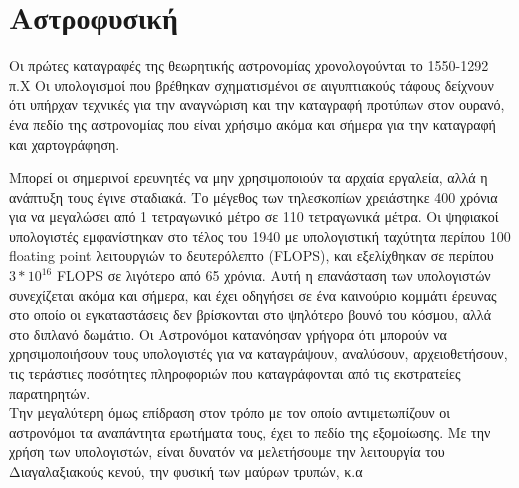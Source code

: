 \section{Αστροφυσική}
Οι πρώτες καταγραφές της θεωρητικής αστρονομίας χρονολογούνται το 1550-1292 π.Χ Οι υπολογισμοί που βρέθηκαν σχηματισμένοι σε αιγυπτιακούς τάφους δείχνουν ότι υπήρχαν τεχνικές για την αναγνώριση και την καταγραφή προτύπων στον ουρανό, ένα πεδίο της αστρονομίας που είναι χρήσιμο ακόμα και σήμερα για την καταγραφή και χαρτογράφηση.

Μπορεί οι σημερινοί ερευνητές να μην χρησιμοποιούν τα αρχαία εργαλεία, αλλά η ανάπτυξη τους έγινε σταδιακά. Το μέγεθος των τηλεσκοπίων χρειάστηκε 400 χρόνια για να μεγαλώσει από 1 τετραγωνικό μέτρο σε 110 τετραγωνικά μέτρα. Οι ψηφιακοί υπολογιστές εμφανίστηκαν στο τέλος του 1940 με υπολογιστική ταχύτητα περίπου 100 floating point λειτουργιών το δευτερόλεπτο (FLOPS), και εξελίχθηκαν σε περίπου $3*10^{16}$ FLOPS σε λιγότερο από 65 χρόνια. Αυτή η επανάσταση των υπολογιστών συνεχίζεται ακόμα και σήμερα, και έχει οδηγήσει σε ένα καινούριο κομμάτι έρευνας στο οποίο οι εγκαταστάσεις δεν βρίσκονται στο ψηλότερο βουνό του κόσμου, αλλά στο διπλανό δωμάτιο. Οι Αστρονόμοι κατανόησαν γρήγορα ότι μπορούν να χρησιμοποιήσουν τους υπολογιστές για να καταγράψουν, αναλύσουν, αρχειοθετήσουν, τις τεράστιες ποσότητες πληροφοριών που καταγράφονται από τις εκστρατείες παρατηρητών.\cite{astrophysics} \\

Την μεγαλύτερη όμως επίδραση στον τρόπο με τον οποίο αντιμετωπίζουν οι αστρονόμοι τα αναπάντητα ερωτήματα τους, έχει το πεδίο της εξομοίωσης. Με την χρήση των υπολογιστών, είναι δυνατόν να μελετήσουμε την λειτουργία του Διαγαλαξιακούς κενού, την φυσική των μαύρων τρυπών, κ.α


